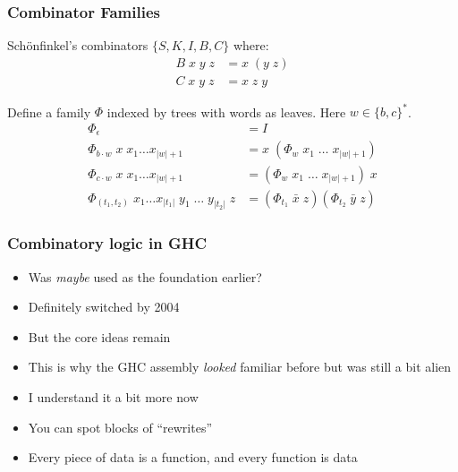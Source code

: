 \documentclass[aspectratio=1610, xcolor={dvipsnames}]{beamer}
\begin{document}
\begin{frame}
    \frametitle{Combinator Families}

    Sch\"onfinkel's combinators \(\{S, K, I, B, C\}\) where:
    \begin{align*}
        B \;x \;y \;z &= x \;(y \;z) \\
        C \;x \;y \;z &= x \;z \;y
    \end{align*}

    \pause

    Define a family \(\Phi\) indexed by trees with words as leaves. Here \(w \in \{b, c\}^*\).
    \begin{align*}
        \Phi_\epsilon &= I \\
        \Phi_{b\cdot w} \; x \; x_1 \ldots x_{|w| + 1}&= x \;(\Phi_w \;x_1 \;\ldots \; x_{|w| + 1}) \\
        \Phi_{c\cdot w} \; x \; x_1 \ldots x_{|w| + 1}&= (\Phi_w \;x_1 \;\ldots \; x_{|w| + 1}) \;x \\
        \Phi_{(t_1, t_2)} \; x_1 \ldots x_{|t_1|} \; y_1 \; \ldots \; y_{|t_2|} \; z &= (\Phi_{t_1} \;\bar x \;z) (\Phi_{t_2} \;\bar y \;z)
    \end{align*}

\end{frame}

\begin{frame}
    \frametitle{Combinatory logic in GHC}

    \begin{itemize}[<+->]
        \item Was \emph{maybe} used as the foundation earlier?
        \item Definitely switched by 2004 \\ 
        \item But the core ideas remain
        \item This is why the GHC assembly \emph{looked} familiar before but was still a bit alien
        \item I understand it a bit more now
        \item You can spot blocks of ``rewrites''
        \item Every piece of data is a function, and every function is data
    \end{itemize}

\end{frame}

\end{document}
